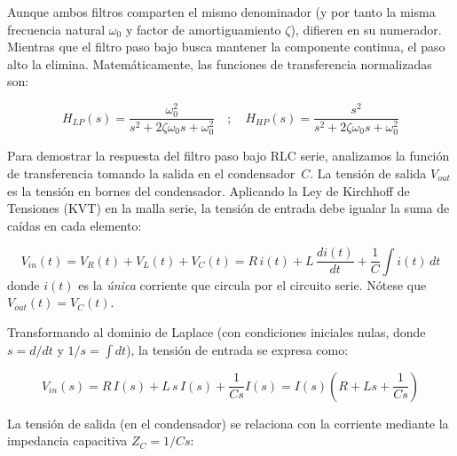 Aunque ambos filtros comparten el mismo denominador (y por tanto la misma frecuencia natural $\omega_0$ y factor de amortiguamiento $\zeta$), difieren en su numerador. Mientras que el filtro paso bajo busca mantener la componente continua, el paso alto la elimina. Matemáticamente, las funciones de transferencia normalizadas son:

\begin{equation}
    H_{LP}(s) = \frac{\omega_0^2}{s^2 + 2\zeta\omega_0s + \omega_0^2} \quad ; \quad H_{HP}(s) = \frac{s^2}{s^2 + 2\zeta\omega_0s + \omega_0^2}
\end{equation}


Para demostrar la respuesta del filtro paso bajo RLC serie, analizamos la función de transferencia tomando la salida en el condensador~$C$.
%
La tensión de salida $V_{out}$ es la tensión en bornes del condensador. Aplicando la Ley de Kirchhoff de Tensiones (KVT) en la malla serie, la tensión de entrada debe igualar la suma de caídas en cada elemento:

\begin{equation}\label{eq:kvt_rlc}
    V_{in}(t) = V_R(t) + V_L(t) + V_C(t)
            = R\,i(t) + L\,\frac{di(t)}{dt} + \frac{1}{C}\int i(t)\,dt
\end{equation}
%
donde $i(t)$ es la \emph{única} corriente que circula por el circuito serie. Nótese que $V_{out}(t) = V_C(t)$.

Transformando al dominio de Laplace (con condiciones iniciales nulas, donde $s = d/dt$ y $1/s = \int dt$), la tensión de entrada se expresa como:

\begin{equation}\label{eq:tension_laplace}
V_{in}(s) = R\,I(s) + L\,s\,I(s) + \frac{1}{Cs}I(s) = I(s)(R + Ls + \frac{1}{Cs})
\end{equation}


La tensión de salida (en el condensador) se relaciona con la corriente mediante la impedancia capacitiva $Z_C = 1/Cs$:

